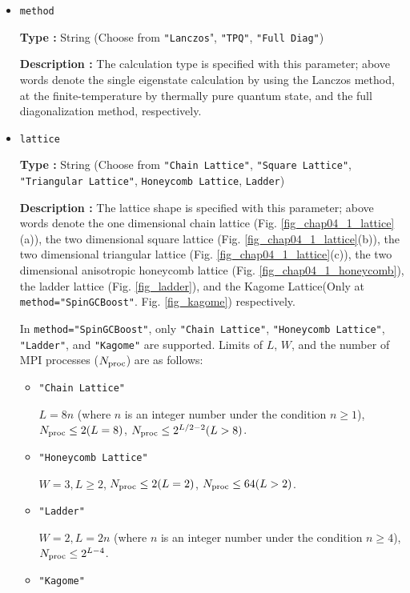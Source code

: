 \begin{itemize}
\item \verb|method|
  
{\bf Type :} String (Choose from \verb|"Lanczos|", \verb|"TPQ"|, \verb|"Full Diag"|)

{\bf Description :} The calculation type is specified with this parameter;
above words denote 
the single eigenstate calculation by using the Lanczos method,
at the finite-temperature by thermally pure quantum state,
and the full diagonalization method,
respectively.

\item \verb|lattice|

{\bf Type :} String (Choose from \verb|"Chain Lattice"|, \verb|"Square Lattice"|, 
\verb|"Triangular Lattice"|, \verb|Honeycomb Lattice|, \verb|Ladder|)

{\bf Description :} The lattice shape is specified with this parameter;
above words denote
the one dimensional chain lattice (Fig. \ref{fig_chap04_1_lattice}(a)), 
the two dimensional square lattice (Fig. \ref{fig_chap04_1_lattice}(b)),
the two dimensional triangular lattice (Fig. \ref{fig_chap04_1_lattice}(c)),
the two dimensional anisotropic honeycomb lattice (Fig. \ref{fig_chap04_1_honeycomb}),
the ladder lattice (Fig. \ref{fig_ladder}),
and
the Kagome Lattice(Only at \verb|method="SpinGCBoost"|. Fig. \ref{fig_kagome})
respectively.

In \verb|method="SpinGCBoost"|,
only \verb|"Chain Lattice"|, \verb|"Honeycomb Lattice"|, 
\verb|"Ladder"|, and \verb|"Kagome"| are supported.
Limits of $L$, $W$, and the number of MPI processes ($N_{\rm proc}$) are as follows:

\begin{itemize}

  \item \verb|"Chain Lattice"|

    $L = 8n$ (where $n$ is an integer number under the condition  $n\geq1$),
    $N_{\rm proc} \leq 2(L=8)$, $N_{\rm proc} \leq 2^{L/2-2}(L>8)$.
    
  \item \verb|"Honeycomb Lattice"|

    $W=3, L \geq 2$, $N_{\rm proc} \leq 2(L=2)$, $N_{\rm proc} \leq 64(L>2)$.

  \item \verb|"Ladder"|

    $W=2, L = 2n$ (where $n$ is an integer number under the condition  $n\geq4$),
    $N_{\rm proc} \leq 2^{L-4}$.

  \item \verb|"Kagome"|


\end{itemize}
\end{itemize}
